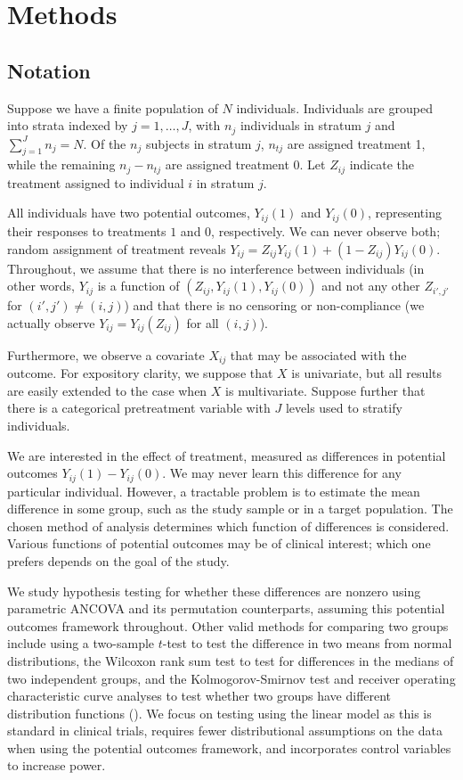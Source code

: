 \documentclass[12pt]{article}
\begin{document}
\section{Methods}\label{sec:methods}

\subsection{Notation}
Suppose we have a finite population of $N$ individuals.
Individuals are grouped into strata indexed by $j = 1, \dots, J$, with $n_j$ individuals in stratum $j$ and $\sum_{j=1}^J n_j = N$.
Of the $n_j$ subjects in stratum $j$, $n_{tj}$ are assigned treatment 1, while the remaining $n_j - n_{tj}$ are assigned treatment 0.
Let $Z_{ij}$ indicate the treatment assigned to individual $i$ in stratum $j$.

All individuals have two potential outcomes, $Y_{ij}(1)$ and $Y_{ij}(0)$, representing their responses to treatments $1$ and $0$, respectively.
We can never observe both; random assignment of treatment reveals $Y_{ij} = Z_{ij}Y_{ij}(1) + (1-Z_{ij})Y_{ij}(0)$.
Throughout, we assume that there is no interference between individuals 
(in other words, $Y_{ij}$ is a function of $(Z_{ij}, Y_{ij}(1), Y_{ij}(0))$ and not any other $Z_{i', j'}$ for $(i', j') \neq (i, j)$)
and that there is no censoring or non-compliance
(we actually observe $Y_{ij} = Y_{ij}(Z_{ij})$ for all $(i, j)$).

Furthermore, we observe a covariate $X_{ij}$ that may be associated with the outcome.
For expository clarity, we suppose that $X$ is univariate, but all results are easily extended to the case when $X$ is multivariate.
Suppose further that there is a categorical pretreatment variable with $J$ levels used to stratify individuals. 

We are interested in the effect of treatment, measured as differences in potential outcomes $Y_{ij}(1) - Y_{ij}(0)$.
We may never learn this difference for any particular individual.
However, a tractable problem is to estimate the mean difference in some group, such as the study sample or in a target population.
The chosen method of analysis determines which function of differences is considered.
Various functions of potential outcomes may be of clinical interest; which one prefers depends on the goal of the study.

We study hypothesis testing for whether these differences are nonzero using parametric ANCOVA and its permutation counterparts, assuming this potential outcomes framework throughout.
Other valid methods for comparing two groups include using a two-sample $t$-test to test the difference in two means from normal distributions,
the Wilcoxon rank sum test to test for differences in the medians of two independent groups, 
and the Kolmogorov-Smirnov test and receiver operating characteristic curve analyses to test whether two groups have different distribution functions (\cite{lehmann_nonparametrics_1975,  vexler_statistical_2016}).
We focus on testing using the linear model as this is standard in clinical trials, requires fewer distributional assumptions on the data when using the potential outcomes framework, and incorporates control variables to increase power.
\end{document}
